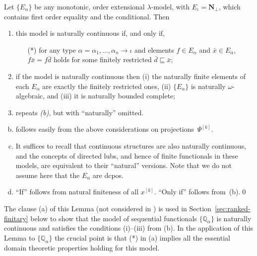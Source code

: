 \documentclass[fleqn]{LMCS}
\theoremstyle{plain}\newtheorem{satz}[thm]{Satz}
\theoremstyle{plain}\newtheorem{hyp}[thm]{Hypothesis}
\theoremstyle{plain}\newtheorem{hyps}[thm]{Hypotheses}
\theoremstyle{definition}\newtheorem{note}[thm]{Note}
\newcommand{\setof}[1]{\{#1\}}
\newcommand{\arr}{\rightarrow}
\newcommand{\NN}{\mathbf{N}}
\newcommand{\bbQ}{\mathbb{Q}}
\newcommand{\Undef}{{\perp}}
\newcommand{\bx}{\bar{x}}
\newcommand{\?}{\mbox{?}}
\begin{document}
\begin{lem}\label{lemma:algebraicity} 
Let $\setof{E_{\alpha}}$ be any monotonic, order extensional 
$\lambda$-model, with $E_\iota=\NN_\Undef$, 
which contains first order equality and the conditional. Then
\begin{enumerate}[\em(a)]
\item this model is naturally continuous 
if, and only if, 
   \begin{itemize}
   \item[(*)] for any type 
$\alpha=\alpha_1,\ldots,\alpha_n\arr\iota$ 
and elements 
$f\in E_\alpha$ and $\bx\in E_{\bar{\alpha}}$, 
$f\bx=f\bar{d}$ holds 
for some finitely restricted 
$\bar{d}\sqsubseteq\bx$; 
   \end{itemize}

\item if the model is naturally continuous 
then 
(i) the naturally finite elements of each $E_\alpha$ 
are exactly the finitely restricted ones, 
(ii) $\setof{E_{\alpha}}$ 
is naturally $\omega$-algebraic, and 
(iii) it is 
naturally bounded complete;  

\item repeats {\em(b)}, but with ``naturally'' omitted. 
\end{enumerate}
\end{lem}
\proof\hfill
\begin{enumerate}[(a)]
\setcounter{enumi}{1}
\item \label{page:algebraicity}
follows easily from the above considerations on projections~$\Psi^{[k]}$. 

\item It suffices to recall that continuous structures 
are also naturally continuous, and 
the concepts of directed lubs, and hence of finite functionals 
in these models, are equivalent to their 
``natural'' versions. 
Note that we do not assume here that the $E_{\alpha}$ are dcpos. 

\setcounter{enumi}{0}
\item ``If'' follows from natural  finiteness of all $x^{[k]}$. 
``Only if'' follows from~(b).\qed
\end{enumerate}



\noindent
The clause (a) of this Lemma (not considered in \cite{Milner77}) 
is used in Section~\ref{sec:ranked-finitary} below to show that 
the model of sequential functionals $\setof{\bbQ_\alpha}$ 
is naturally continuous and satisfies the conditions (i)--(iii) from (b). 
In the application of this Lemma to $\setof{\bbQ_\alpha}$ the crucial point 
is that (*) in (a) implies all the essential domain theoretic properties 
holding for this model. 
\end{document}
